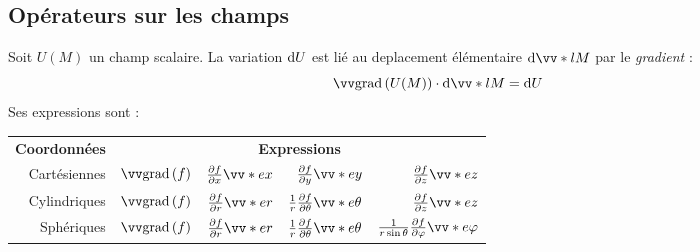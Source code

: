 \documentclass[11pt,a4paper,fleqn,pdftex]{report}
\begin{document}
\subsection{Opérateurs sur les champs} %
\label{sub:operateurs_sur_les_champs}
\begin{dfn}[Gradient]
   Soit $U(M)$ un champ scalaire. La variation $\mathrm{d} U$ est lié au deplacement élémentaire $\d\vv*{l}{M}$ par le  \emph{gradient} :
   \begin{equation}
   \grad[U(M)] \cdot \d\vv*{l}{M} = \d{}U
   \end{equation}
   Ses expressions sont :
   \begin{center}
   \begin{tabular}{r r@{$\:\: = \:\:$}r@{$ + $}r@{$ + $}r}
      \textbf{Coordonnées} & \multicolumn{4}{c}{\textbf{Expressions}} \\
      Cartésiennes        & $\grad[f] $ &  $\frac{\partial f}{\partial x}\vv*{e}{x}$ & $\frac{\partial f}{\partial y}\vv*{e}{y}$ & $\frac{\partial f}{\partial z}\vv*{e}{z}$ \\
      Cylindriques        & $\grad[f] $ &  $\frac{\partial f}{\partial r}\vv*{e}{r}$ & $\frac{1}{r}\frac{\partial f}{\partial \theta}\vv*{e}{\theta}$ & $\frac{\partial f}{\partial z}\vv*{e}{z}$ \\
      Sphériques          & $\grad[f] $ &  $\frac{\partial f}{\partial r}\vv*{e}{r}$ & $\frac{1}{r}\frac{\partial f}{\partial \theta}\vv*{e}{\theta}$ & $\frac{1}{r\sin \theta}\frac{\partial f}{\partial \varphi}\vv*{e}{\varphi}$
   \end{tabular}
   \end{center}
\end{dfn}
\end{document}
